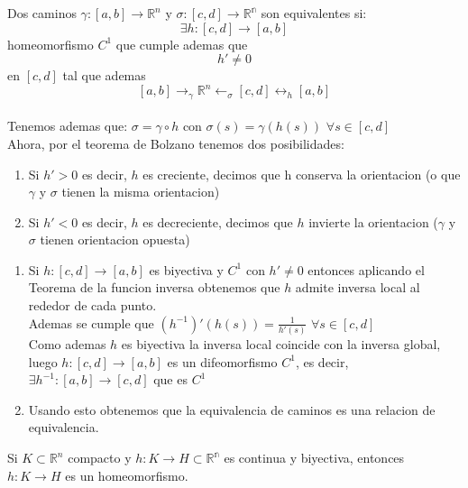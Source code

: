 \begin{definición}
Dos caminos $\gamma: [a,b] \to \mathbb{R}^n$ y $\sigma:[c,d] \to \mathbb{R^n}$ son equivalentes si: \\
$$ \exists h:[c,d] \to [a,b] $$ homeomorfismo $C^1$ que cumple ademas que \\
$$h' \neq 0$$ en $[c,d]$ tal que ademas $$[a,b] \to_{\gamma} \mathbb{R}^n \leftarrow_\sigma [c,d] \leftrightarrow_{h} [a,b]$$ \\
Tenemos ademas que: $\sigma = \gamma \circ h$ con $\sigma(s) = \gamma(h(s))$ $\forall s \in [c,d]$ \\
Ahora, por el teorema de Bolzano tenemos dos posibilidades:
\begin{enumerate}
    \item Si $h'>0$ es decir, $h$ es creciente, decimos que h conserva la orientacion (o
          que $\gamma$ y $\sigma$ tienen la misma orientacion)
    \item Si $h'<0$ es decir, $h$ es decreciente, decimos que $h$ invierte la orientacion
          ($\gamma$ y $\sigma$ tienen orientacion opuesta)
\end{enumerate}
\end{definición}

\begin{observación}
\vspace{-2.5em}
\begin{enumerate}
    \item Si $h:[c,d] \to [a,b]$ es biyectiva y $C^1$ con $h' \neq 0$ entonces aplicando
          el Teorema de la funcion inversa obtenemos que $h$ admite inversa local al
          rededor de cada punto. \\ Ademas se cumple que $(h^{-1})'(h(s)) =
              \frac{1}{h'(s)}$ $\forall s \in [c,d]$ \\ Como ademas $h$ es biyectiva la
          inversa local coincide con la inversa global, luego $h:[c,d] \to [a,b]$ es un
          difeomorfismo $C^1$, es decir, $\exists h^{-1}:[a,b] \to [c,d]$ que es $C^1$
    \item Usando esto obtenemos que la equivalencia de caminos es una relacion de
          equivalencia.
\end{enumerate}
\end{observación}

\begin{observación}
Si $K\subset \mathbb{R}^n$ compacto y $h:K \to H\subset \mathbb{R^n}$ es continua y biyectiva, entonces $h:K \to H$ es un homeomorfismo.
\end{observación}

